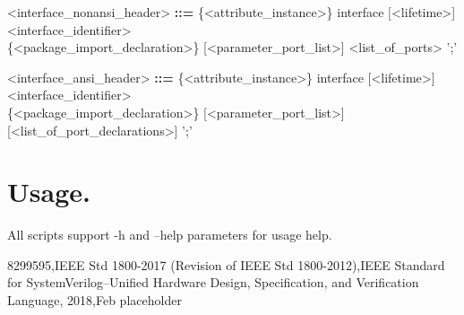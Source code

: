 \documentclass{article}
\begin{document}
\begin{grammar}
<interface_nonansi_header> \textbf{::=} \{<attribute_instance>\} interface [<lifetime>] <interface_identifier> \\
                                        \{<package_import_declaration>\} [<parameter_port_list>] <list_of_ports> ';'
\end{grammar}
\begin{grammar}
<interface_ansi_header> \textbf{::=} \{<attribute_instance>\} interface [<lifetime>] <interface_identifier> \\
                                     \{<package_import_declaration>\} [<parameter_port_list>] [<list_of_port_declarations>] ';'
\end{grammar}





%


\section{Usage.}
{ All scripts support -h and --help parameters for usage help.}

\begin{thebibliography}{9}
8299595,IEEE Std 1800-2017 (Revision of IEEE Std 1800-2012),IEEE Standard for SystemVerilog--Unified Hardware Design, Specification, and Verification Language,
2018,Feb
placeholder

\end{thebibliography}
\end{document}
